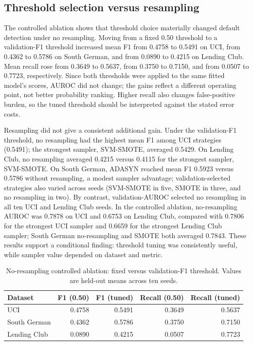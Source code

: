 \documentclass[pdflatex,sn-mathphys-num]{sn-jnl}
\begin{document}
\subsection{Threshold selection versus resampling}
The controlled ablation shows that threshold choice materially changed default detection under no resampling. Moving from a fixed 0.50 threshold to a validation-F1 threshold increased mean F1 from 0.4758 to 0.5491 on UCI, from 0.4362 to 0.5786 on South German, and from 0.0890 to 0.4215 on Lending Club. Mean recall rose from 0.3649 to 0.5637, from 0.3750 to 0.7150, and from 0.0507 to 0.7723, respectively. Since both thresholds were applied to the same fitted model's scores, AUROC did not change; the gains reflect a different operating point, not better probability ranking. Higher recall also changes false-positive burden, so the tuned threshold should be interpreted against the stated error costs.

Resampling did not give a consistent additional gain. Under the validation-F1 threshold, no resampling had the highest mean F1 among UCI strategies (0.5491); the strongest sampler, SVM-SMOTE, averaged 0.5429. On Lending Club, no resampling averaged 0.4215 versus 0.4115 for the strongest sampler, SVM-SMOTE. On South German, ADASYN reached mean F1 0.5923 versus 0.5786 without resampling, a modest sampler advantage; validation-selected strategies also varied across seeds (SVM-SMOTE in five, SMOTE in three, and no resampling in two). By contrast, validation-AUROC selected no resampling in all ten UCI and Lending Club seeds. In the controlled ablation, no-resampling AUROC was 0.7878 on UCI and 0.6753 on Lending Club, compared with 0.7806 for the strongest UCI sampler and 0.6659 for the strongest Lending Club sampler; South German no-resampling and SMOTE both averaged 0.7843. These results support a conditional finding: threshold tuning was consistently useful, while sampler value depended on dataset and metric.

\begin{table}[ht]
\centering\small
\caption{No-resampling controlled ablation: fixed versus validation-F1 threshold. Values are held-out means across ten seeds.}
\label{tab:threshold-ablation}
\begin{tabular}{lrrrr}
\hline
Dataset & F1 (0.50) & F1 (tuned) & Recall (0.50) & Recall (tuned) \\
\hline
UCI & 0.4758 & 0.5491 & 0.3649 & 0.5637 \\
South German & 0.4362 & 0.5786 & 0.3750 & 0.7150 \\
Lending Club & 0.0890 & 0.4215 & 0.0507 & 0.7723 \\
\hline
\end{tabular}
\end{table}
\end{document}
